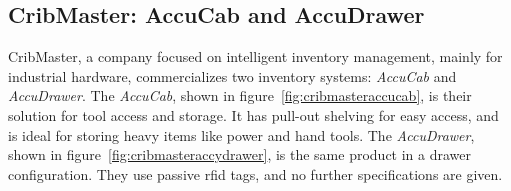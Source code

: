 \subsection{CribMaster: AccuCab and AccuDrawer}

CribMaster, a company focused on intelligent inventory management, mainly for industrial hardware, commercializes two inventory systems: \emph{AccuCab} and \emph{AccuDrawer}.
The \emph{AccuCab}, shown in figure~\ref{fig:cribmasteraccucab}, is their solution for tool access and storage. It has pull-out shelving for easy access, and is ideal for storing heavy items like power and hand tools.
The \emph{AccuDrawer}, shown in figure~\ref{fig:cribmasteraccydrawer}, is the same product in a drawer configuration.
They use passive \ac{rfid} tags, and no further specifications are given.

